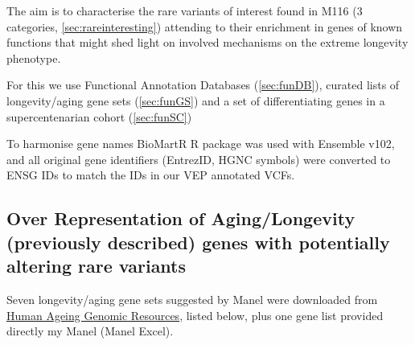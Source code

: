 \documentclass{article}\usepackage[]{graphicx}\usepackage[dvipsnames]{xcolor}
\begin{document}
The aim is to characterise the rare variants of interest found in M116 (3 categories, \autoref{sec:rareinteresting}) attending to their enrichment in genes of known functions that might shed light on involved mechanisms on the extreme longevity phenotype.

For this we use Functional Annotation Databases (\autoref{sec:funDB}), curated lists of longevity/aging gene sets (\autoref{sec:funGS}) and a set of differentiating genes in a supercentenarian cohort (\autoref{sec:funSC})

To harmonise gene names BioMartR R package \cite{drost2017biomartr} was used with Ensemble v102, and all original gene identifiers (EntrezID, HGNC symbols) were converted to ENSG IDs to match the IDs in our VEP annotated VCFs.




\subsection{Over Representation of Aging/Longevity (previously described) genes with potentially altering rare variants}
\label{sec:funGS}

Seven longevity/aging gene sets suggested by Manel were downloaded from \href{https://genomics.senescence.info/}{Human Ageing Genomic Resources}, listed below, plus one gene list provided directly my Manel (Manel Excel).
\end{document}
